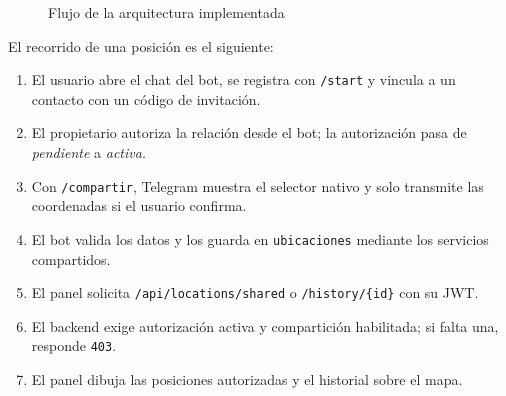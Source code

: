\begin{figure}[H]
	\centering
	\caption{Flujo de la arquitectura implementada}
	\label{fig:arquitectura}
\end{figure}

El recorrido de una posición es el siguiente:

\begin{enumerate}[leftmargin=*, topsep=2pt, itemsep=2pt]
	\item El usuario abre el chat del bot, se registra con \texttt{/start} y vincula a un contacto con un código de invitación.
	\item El propietario autoriza la relación desde el bot; la autorización pasa de \emph{pendiente} a \emph{activa}.
	\item Con \texttt{/compartir}, Telegram muestra el selector nativo y solo transmite las coordenadas si el usuario confirma.
	\item El bot valida los datos y los guarda en \texttt{ubicaciones} mediante los servicios compartidos.
	\item El panel solicita \texttt{/api/locations/shared} o \texttt{/history/\{id\}} con su JWT.
	\item El backend exige autorización activa y compartición habilitada; si falta una, responde \texttt{403}.
	\item El panel dibuja las posiciones autorizadas y el historial sobre el mapa.
\end{enumerate}

